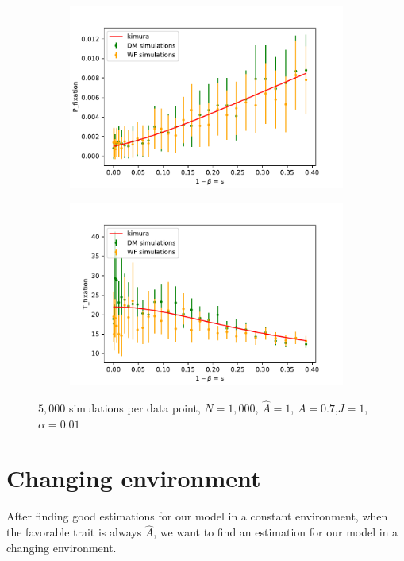\documentclass[11pt]{article}
\begin{document}
\begin{figure}[t]
  \begin{center}
  \begin{subfigure}[a]{0.49\linewidth}
    \includegraphics[width=\linewidth]{../figures/binary/fix_prob_var_beta.pdf}
   \end{subfigure}
   \begin{subfigure}[a]{0.49\linewidth}
    \includegraphics[width=\linewidth]{../figures/binary/fix_time_var_beta.pdf}
   \end{subfigure}
  \end{center}
  \caption{$5,000$ simulations per data point, $N=1,000$, $\hat{A}=1$, $A=0.7$,$J=1$,$\alpha=0.01$}
  \label{fig:var_beta}
\end{figure}

\section{Changing environment}
After finding good estimations for our model in a constant environment, when the favorable trait is always $\hat{A}$, we want to find an estimation for our model in a changing environment.
\end{document}
